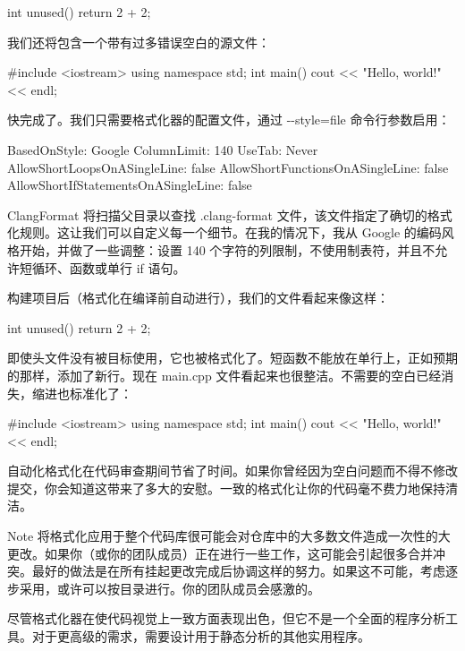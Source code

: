 
\begin{cpp}
int unused() { return 2 + 2; }
\end{cpp}

我们还将包含一个带有过多错误空白的源文件：


\begin{cpp}
#include <iostream>
                                using namespace std;
                    int main() {
        cout << "Hello, world!" << endl;
                                            }
\end{cpp}

快完成了。我们只需要格式化器的配置文件，通过 -{}-style=file 命令行参数启用：



\begin{shell}
BasedOnStyle: Google
ColumnLimit: 140
UseTab: Never
AllowShortLoopsOnASingleLine: false
AllowShortFunctionsOnASingleLine: false
AllowShortIfStatementsOnASingleLine: false
\end{shell}

ClangFormat 将扫描父目录以查找 .clang-format 文件，该文件指定了确切的格式化规则。这让我们可以自定义每一个细节。在我的情况下，我从 Google 的编码风格开始，并做了一些调整：设置 140 个字符的列限制，不使用制表符，并且不允许短循环、函数或单行 if 语句。

构建项目后（格式化在编译前自动进行），我们的文件看起来像这样：


\begin{cpp}
int unused() {
    return 2 + 2;
}
\end{cpp}

即使头文件没有被目标使用，它也被格式化了。短函数不能放在单行上，正如预期的那样，添加了新行。现在 main.cpp 文件看起来也很整洁。不需要的空白已经消失，缩进也标准化了：


\begin{cpp}
#include <iostream>
using namespace std;
int main() {
    cout << "Hello, world!" << endl;
}
\end{cpp}

自动化格式化在代码审查期间节省了时间。如果你曾经因为空白问题而不得不修改提交，你会知道这带来了多大的安慰。一致的格式化让你的代码毫不费力地保持清洁。

\begin{myNotic}{Note}
将格式化应用于整个代码库很可能会对仓库中的大多数文件造成一次性的大更改。如果你（或你的团队成员）正在进行一些工作，这可能会引起很多合并冲突。最好的做法是在所有挂起更改完成后协调这样的努力。如果这不可能，考虑逐步采用，或许可以按目录进行。你的团队成员会感激的。
\end{myNotic}

尽管格式化器在使代码视觉上一致方面表现出色，但它不是一个全面的程序分析工具。对于更高级的需求，需要设计用于静态分析的其他实用程序。










